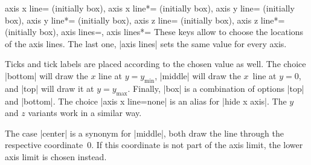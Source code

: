 \begin{pgfplotskeylist}{%
    axis x line= (initially box),
    axis x line*= (initially box),
    axis y line= (initially box),
    axis y line*= (initially box),
    axis z line= (initially box),
    axis z line*= (initially box),
    axis lines=,
    axis lines*=%
}
    These keys allow to choose the locations of the axis lines. The last one,
    |axis lines| sets the same value for every axis.

    Ticks and tick labels are placed according to the chosen value as well. The
    choice |bottom| will draw the $x$ line at $y=y_{\min}$, |middle| will draw
    the $x$~line at $y=0$, and |top| will draw it at $y=y_{\max}$. Finally,
    |box| is a combination of options |top| and |bottom|. The choice
    |axis x line=none| is an alias for |hide x axis|. The $y$ and $z$ variants
    work in a similar way.

    The case |center| is a synonym for |middle|, both draw the line through the
    respective coordinate~$0$. If this coordinate is not part of the axis
    limit, the lower axis limit is chosen instead.


\end{pgfplotskeylist}
